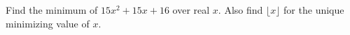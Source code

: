 Find the minimum of $15x^2+15x+16$ over real $x$. Also find $\lfloor x\rfloor$ for the unique minimizing value of $x$.
